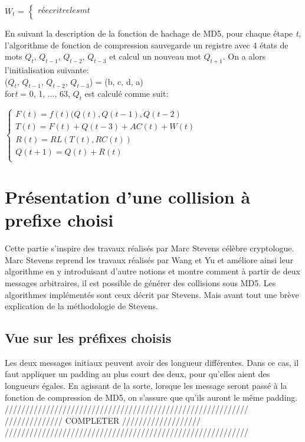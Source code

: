 \documentclass[a4paper,11pt,french]{article}
\begin{document}
$W_{t}$ =
$\left\{
\begin{array}{l}
  réecritre les mt\\
\end{array}
\right.$
\vspace{.5cm}

En suivant la description de la fonction de hachage de MD5, pour chaque étape {\it{t}}, l'algorithme de fonction de compression sauvegarde un registre avec 4 états de mots $Q_{t}$, $Q_{t-1}$, $Q_{t-2}$, $Q_{t-3}$ et calcul un nouveau mot $Q_{t+1}$. On a alors l'initialisation suivante:\\
($Q_{t}$, $Q_{t-1}$, $Q_{t-2}$, $Q_{t-3}$) = (b, c, d, a)\\
for{\it{t}} = 0, 1, ..., 63, $Q_{t}$ est calculé comme suit:
\vspace{.5cm}

$\left\{
\begin{array}{l}
  F(t) = f(t)(Q(t), Q(t-1), Q(t-2) \\
  T(t) = F(t) + Q(t-3) + AC(t) + W(t) \\
  R(t) = RL(T(t), RC(t)) \\
  Q(t+1) = Q(t) + R(t) \\
\end{array}
\right.$
\vspace{.5cm}

\section{Présentation d'une collision à prefixe choisi}
Cette partie s'inspire des travaux réalisés par Marc Stevens célèbre cryptologue. Marc Stevens reprend les travaux réalisés par Wang et Yu et améliore ainsi leur algorithme en y introduisant d'autre notions et montre comment à partir de deux messages arbitraires, il est possible de générer des collisions sous MD5. Les algorithmes implémentés sont ceux décrit par Stevens. Mais avant tout une brève explication de la méthodologie de Stevens.

\subsection{Vue sur les préfixes choisis}
Les deux messages initiaux peuvent avoir des longueur différentes. Dans ce cas, il faut appliquer un padding au plus court des deux, pour qu'elles aient des longueurs égales. En agissant de la sorte, lorsque les message seront passé à la fonction de compression de MD5, on s'assure que qu'ils auront le même padding. \\
///////////////////////////////////////////////////////////\\
////////////// COMPLETER ///////////////////\\
///////////////////////////////////////////////////////////\\
\end{document}
